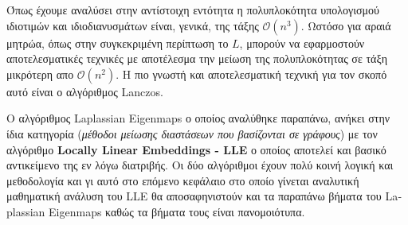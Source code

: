\hspace*{\fill}\newline
\par
Όπως έχουμε αναλύσει στην αντίστοιχη εντότητα η πολυπλοκότητα υπολογισμού ιδιοτιμών και ιδιοδιανυσμάτων είναι, γενικά, της τάξης $\mathcal{O}(n^{3})$. Ωστόσο για αραιά μητρώα, όπως στην συγκεκριμένη περίπτωση το $L$, μπορούν να εφαρμοστούν αποτελεσματικές τεχνικές με αποτέλεσμα την μείωση της πολυπλοκότητας σε τάξη μικρότερη απο $\mathcal{O}(n^2)$. Η πιο γνωστή και αποτελεσματική τεχνική για τον σκοπό αυτό είναι ο αλγόριθμος \textlatin{Lanczos}.
\par
Ο αλγόριθμος \textlatin{Laplassian Eigenmaps} ο οποίος αναλύθηκε παραπάνω, ανήκει στην ίδια κατηγορία (\textit{μέθοδοι μείωσης διαστάσεων που βασίζονται σε γράφους}) με τον αλγόριθμο \textbf{\textlatin{Locally Linear Embeddings - LLE}} ο οποίος αποτελεί και βασικό αντικείμενο της εν λόγω διατριβής. Οι δύο αλγόριθμοι έχουν πολύ κοινή λογική και μεθοδολογία και γι αυτό στο επόμενο κεφάλαιο στο οποίο γίνεται αναλυτική μαθηματική ανάλυση του \textlatin{LLE} θα αποσαφηνιστούν και τα παραπάνω βήματα του \textlatin{Laplassian Eigenmaps} καθώς τα βήματα τους είναι πανομοιότυπα.

